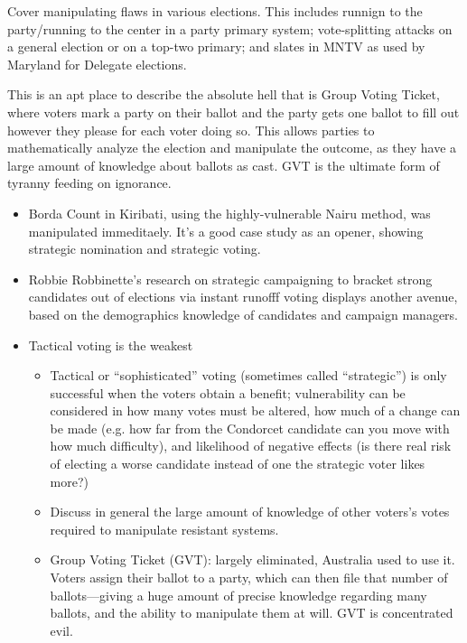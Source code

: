 \begin{todo}
    Cover manipulating flaws in various elections.  This includes runnign to the party/running to the center in a party primary system; vote-splitting attacks on a general election or on a top-two primary; and slates in MNTV as used by Maryland for Delegate elections.

    This is an apt place to describe the absolute hell that is Group Voting Ticket, where voters mark a party on their ballot and the party gets one ballot to fill out however they please for each voter doing so.  This allows parties to mathematically analyze the election and manipulate the outcome, as they have a large amount of knowledge about ballots as cast.  GVT is the ultimate form of tyranny feeding on ignorance.
\end{todo}
\begin{itemize}
    \item Borda Count in Kiribati, using the highly-vulnerable Nairu method, was manipulated immeditaely.  It's a good case study as an opener, showing strategic nomination and strategic voting.

    \item Robbie Robbinette's research on strategic campaigning to bracket strong candidates out of elections via instant runofff voting displays another avenue, based on the demographics knowledge of candidates and campaign managers.

    \item Tactical voting is the weakest
    \begin{itemize}
        \item Tactical or ``sophisticated'' voting (sometimes called ``strategic'') is only successful when the voters obtain a benefit; vulnerability can be considered in how many votes must be altered, how much of a change can be made (e.g. how far from the Condorcet candidate can you move with how much difficulty), and likelihood of negative effects (is there real risk of electing a worse candidate instead of one the strategic voter likes more?)

        \item Discuss in general the large amount of knowledge of other voters's votes required to manipulate resistant systems.

        \item Group Voting Ticket (GVT):  largely eliminated, Australia used to use it.  Voters assign their ballot to a party, which can then file that number of ballots—giving a huge amount of precise knowledge regarding many ballots, and the ability to manipulate them at will.  GVT is concentrated evil.


\end{itemize}
\end{itemize}

